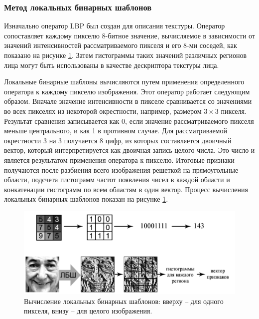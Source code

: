\subsubsection{Метод локальных бинарных шаблонов}

Изначально оператор LBP \cite{LBP} был создан для описания текстуры. Оператор
сопоставляет каждому пикселю 8-битное значение, вычисляемое в зависимости от
значений интенсивностей рассматриваемого пикселя и его 8-ми соседей, как
показано на рисунке \ref{fig:lbp-operator}. Затем гистограммы таких значений
различных регионов лица могут быть использованы в качестве дескриптора текстуры
лица.


Локальные бинарные шаблоны вычисляются путем применения определенного оператора
к каждому пикселю изображения. Этот оператор работает следующим образом. Вначале
значение интенсивности в пикселе сравнивается со значениями во всех пикселях из
некоторой окрестности, например, размером $3\times3$ пикселя. Результат сравнения
записывается как 0, если значение рассматриваемого пикселя меньше центрального,
и как 1 в противном случае. Для рассматриваемой окрестности 3 на 3 получается 8
цифр, из которых составляется двоичный вектор, который интерпретируется как
двоичная запись целого числа. Это число и является результатом применения
оператора к пикселю. Итоговые признаки получаются после разбиения всего
изображения решеткой на прямоугольные области, подсчета гистограмм частот
появления чисел в каждой области и конкатенации гистограмм по всем областям в
один вектор. Процесс вычисления локальных бинарных шаблонов показан на рисунке
\ref{fig:lbp-operator}.

\begin{figure}[h!]  \centering
  \includegraphics[height=.2\textheight]{lbp-operator.png}
    \captionsetup{justification=centering}
  \caption{Вычисление локальных бинарных шаблонов: вверху – для одного пикселя,
внизу – для целого изображения.}
  \label{fig:lbp-operator}
\end{figure}

